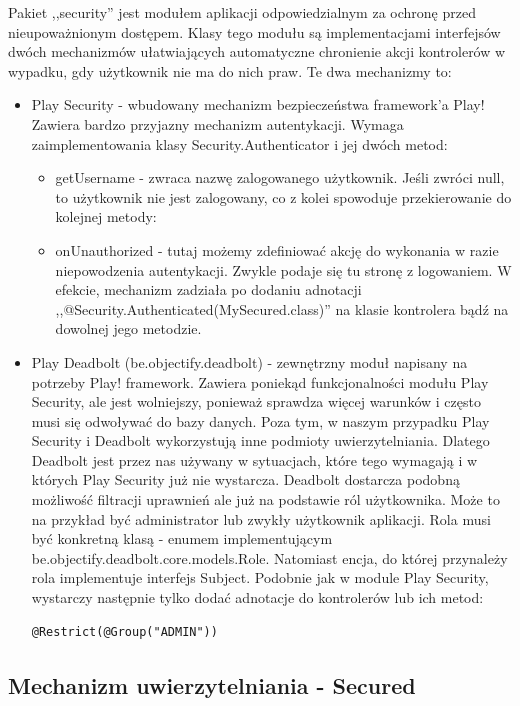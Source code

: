 \documentclass[a4paper,12pt,notitlepage]{mwrep}
\begin{document}
Pakiet ,,security'' jest modułem aplikacji odpowiedzialnym za ochronę przed nieupoważnionym dostępem. Klasy tego modułu są implementacjami interfejsów dwóch mechanizmów ułatwiających automatyczne chronienie akcji kontrolerów w wypadku, gdy użytkownik nie ma do nich praw. Te dwa mechanizmy to:
\begin{itemize}
	\item	Play Security - wbudowany mechanizm bezpieczeństwa framework'a Play! Zawiera bardzo przyjazny mechanizm autentykacji. Wymaga zaimplementowania klasy Security.Authenticator i jej dwóch metod:
	\begin{itemize}
		\item	getUsername - zwraca nazwę zalogowanego użytkownik. Jeśli zwróci null, to użytkownik nie jest zalogowany, co z kolei spowoduje przekierowanie do kolejnej metody: 
		\item	onUnauthorized - tutaj możemy zdefiniować akcję do wykonania w razie niepowodzenia autentykacji. Zwykle podaje się tu stronę z logowaniem. W efekcie, mechanizm zadziała po dodaniu adnotacji ,,@Security.Authenticated(MySecured.class)'' na klasie kontrolera bądź na dowolnej jego metodzie.
	\end{itemize}	
	\item	Play Deadbolt (be.objectify.deadbolt) - zewnętrzny moduł napisany na potrzeby Play! framework. Zawiera poniekąd funkcjonalności modułu Play Security, ale jest wolniejszy, ponieważ sprawdza więcej warunków i często musi się odwoływać do bazy danych. Poza tym, w naszym przypadku Play Security i Deadbolt wykorzystują inne podmioty uwierzytelniania. Dlatego Deadbolt jest przez nas używany w sytuacjach, które tego wymagają i w których Play Security już nie wystarcza. Deadbolt dostarcza podobną możliwość filtracji uprawnień ale już na podstawie ról użytkownika. Może to na przykład być administrator lub zwykły użytkownik aplikacji. Rola musi być konkretną klasą - enumem implementującym be.objectify.deadbolt.core.models.Role. Natomiast encja, do której przynależy rola implementuje interfejs Subject. Podobnie jak w module Play Security, wystarczy następnie tylko dodać adnotacje do kontrolerów lub ich metod: \begin{verbatim}@Restrict(@Group("ADMIN"))\end{verbatim}
\end{itemize}

\subsection{Mechanizm uwierzytelniania - Secured}
\end{document}
